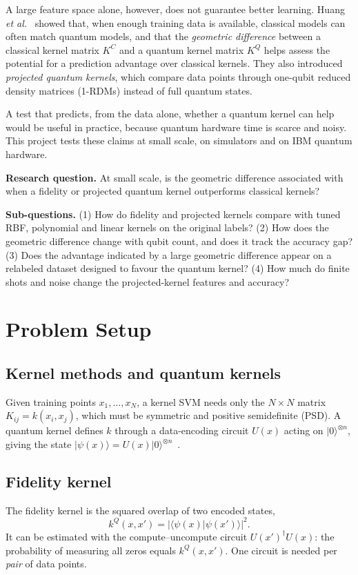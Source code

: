 \documentclass[conference]{IEEEtran}
\begin{document}
A large feature space alone, however, does not guarantee better learning. Huang \textit{et al.}~\cite{huang2021} showed that, when enough training data is available, classical models can often match quantum models, and that the \emph{geometric difference} between a classical kernel matrix $K^{C}$ and a quantum kernel matrix $K^{Q}$ helps assess the potential for a prediction advantage over classical kernels. They also introduced \emph{projected quantum kernels}, which compare data points through one-qubit reduced density matrices (1-RDMs) instead of full quantum states.

A test that predicts, from the data alone, whether a quantum kernel can help would be useful in practice, because quantum hardware time is scarce and noisy. This project tests these claims at small scale, on simulators and on IBM quantum hardware.

\textbf{Research question.} At small scale, is the geometric difference associated with when a fidelity or projected quantum kernel outperforms classical kernels?

\textbf{Sub-questions.} (1) How do fidelity and projected kernels compare with tuned RBF, polynomial and linear kernels on the original labels? (2) How does the geometric difference change with qubit count, and does it track the accuracy gap? (3) Does the advantage indicated by a large geometric difference appear on a relabeled dataset designed to favour the quantum kernel? (4) How much do finite shots and noise change the projected-kernel features and accuracy?

\section{Problem Setup}
\subsection{Kernel methods and quantum kernels}
Given training points $x_1,\dots,x_N$, a kernel SVM needs only the $N\times N$ matrix $K_{ij}=k(x_i,x_j)$, which must be symmetric and positive semidefinite (PSD). A quantum kernel defines $k$ through a data-encoding circuit $U(x)$ acting on $|0\rangle^{\otimes n}$, giving the state $|\psi(x)\rangle=U(x)|0\rangle^{\otimes n}$~\cite{schuld2019,havlicek2019}.

\subsection{Fidelity kernel}
The fidelity kernel is the squared overlap of two encoded states,
\begin{equation}
k^{Q}(x,x') = |\langle \psi(x)|\psi(x')\rangle|^{2}.
\end{equation}
It can be estimated with the compute--uncompute circuit $U(x')^\dagger U(x)$: the probability of measuring all zeros equals $k^{Q}(x,x')$. One circuit is needed per \emph{pair} of data points.
\end{document}
